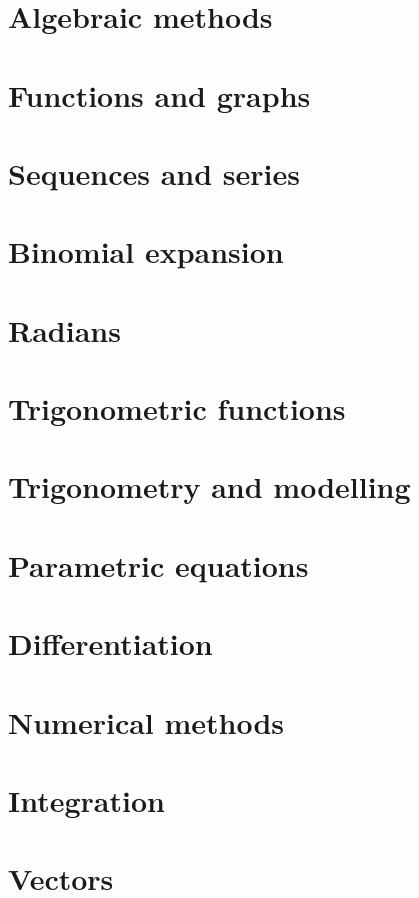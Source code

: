 \chapter{Algebraic methods}


\chapter{Functions and graphs}


\chapter{Sequences and series}


\chapter{Binomial expansion}


\chapter{Radians}


\chapter{Trigonometric functions}


\chapter{Trigonometry and modelling}


\chapter{Parametric equations}


\chapter{Differentiation}


\chapter{Numerical methods}


\chapter{Integration}


\chapter{Vectors}
